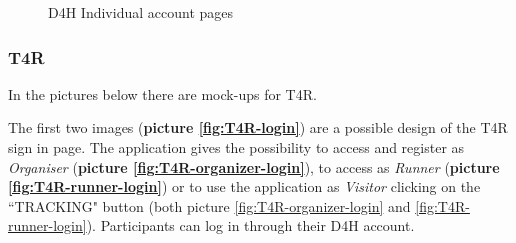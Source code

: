 \begin{figure}[H]
  \centering
  
  
  \caption{D4H Individual account pages}
  \label{fig:ASOS-individual-account}
  
\end{figure}


\subsubsection{T4R}
In the pictures below there are mock-ups for T4R.

The first two images (\textbf{picture \ref{fig:T4R-login}}) are a possible design of the T4R sign in page. The application gives the possibility to access and register as \emph{Organiser} (\textbf{picture \ref{fig:T4R-organizer-login}}), to access as \emph{Runner} (\textbf{picture \ref{fig:T4R-runner-login}}) or to use the application as \emph{Visitor} clicking on the ``TRACKING" button (both picture \ref{fig:T4R-organizer-login} and \ref{fig:T4R-runner-login}). Participants can log in through their D4H account.

